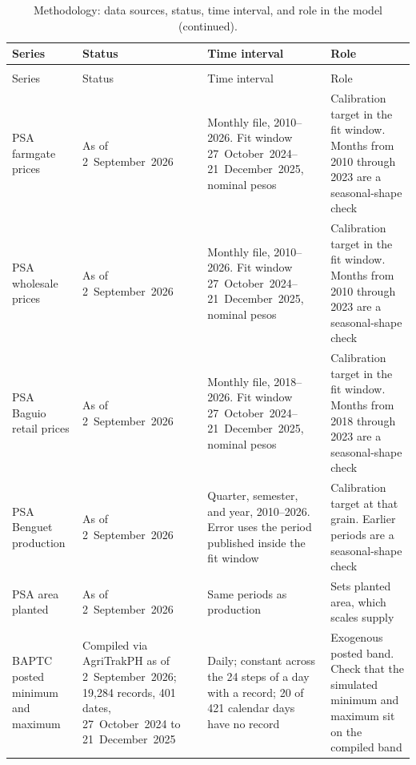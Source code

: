 \documentclass{icsthesis}
\begin{document}
\begin{mainmatter}
			\begingroup
			\footnotesize
			\setlength{\LTcapwidth}{\textwidth}
			\setlength{\tabcolsep}{3pt}
			\renewcommand{\arraystretch}{1.12}
			\begin{longtable}[l]{@{}>{\raggedright\arraybackslash}p{}>{\raggedright\arraybackslash}p{}>{\raggedright\arraybackslash}p{}>{\raggedright\arraybackslash}p{}@{}}
			\caption{Methodology: data sources, status, time interval, and role in the model.}
			\label{tab:ch3-data}\\
			\hline\hline
			Series & Status & Time interval & Role \\
			\hline
			\endfirsthead
			\caption[]{Methodology: data sources, status, time interval, and role in the model (continued).}\\
			\hline\hline
			Series & Status & Time interval & Role \\
			\hline
			\endhead
			\hline
			\endfoot
			\hline\hline
			\endlastfoot
			PSA farmgate prices & As of 2~September~2026 & Monthly file, 2010--2026. Fit window 27~October~2024--21~December~2025, nominal pesos & Calibration target in the fit window. Months from 2010 through 2023 are a seasonal-shape check \\
			PSA wholesale prices & As of 2~September~2026 & Monthly file, 2010--2026. Fit window 27~October~2024--21~December~2025, nominal pesos & Calibration target in the fit window. Months from 2010 through 2023 are a seasonal-shape check \\
			PSA Baguio retail prices & As of 2~September~2026 & Monthly file, 2018--2026. Fit window 27~October~2024--21~December~2025, nominal pesos & Calibration target in the fit window. Months from 2018 through 2023 are a seasonal-shape check \\
			PSA Benguet production & As of 2~September~2026 & Quarter, semester, and year, 2010--2026. Error uses the period published inside the fit window & Calibration target at that grain. Earlier periods are a seasonal-shape check \\
			PSA area planted & As of 2~September~2026 & Same periods as production & Sets planted area, which scales supply \\
			BAPTC posted minimum and maximum \citep{AgriTrakPH2025} & Compiled via AgriTrakPH as of 2~September~2026; 19,284 records, 401 dates, 27~October~2024 to 21~December~2025 & Daily; constant across the 24 steps of a day with a record; 20 of 421 calendar days have no record & Exogenous posted band. Check that the simulated minimum and maximum sit on the compiled band \\

\end{longtable}
\end{mainmatter}
\end{document}
